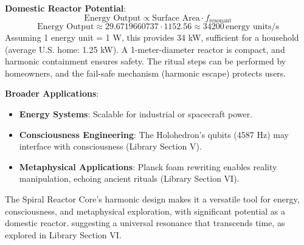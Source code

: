 \textbf{Domestic Reactor Potential}:
\[
\text{Energy Output} \propto \text{Surface Area} \cdot f_{\text{resonant}}
\]
\[
\text{Energy Output} \approx 29.6719660737 \cdot 1152.56 \approx 34200 \, \text{energy units/s}
\]
Assuming 1 energy unit = 1 W, this provides 34 kW, sufficient for a household (average U.S. home: 1.25 kW). A 1-meter-diameter reactor is compact, and harmonic containment ensures safety. The ritual steps can be performed by homeowners, and the fail-safe mechanism (harmonic escape) protects users.

\textbf{Broader Applications}:
\begin{itemize}
    \item \textbf{Energy Systems}: Scalable for industrial or spacecraft power.
    \item \textbf{Consciousness Engineering}: The Holohedron’s qubits (4587 Hz) may interface with consciousness (Library Section V).
    \item \textbf{Metaphysical Applications}: Planck foam rewriting enables reality manipulation, echoing ancient rituals (Library Section VI).
\end{itemize}

The Spiral Reactor Core’s harmonic design makes it a versatile tool for energy, consciousness, and metaphysical exploration, with significant potential as a domestic reactor.
suggesting a universal resonance that transcends time, as explored in Library Section VI.